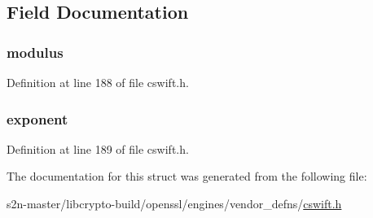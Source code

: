 \subsection{Field Documentation}
\subsubsection[{\texorpdfstring{modulus}{modulus}}]{ modulus}\hypertarget{struct___s_w___e_x_p_a9f75d3cee7e8a48a96f993a4d18b605e}{}\label{struct___s_w___e_x_p_a9f75d3cee7e8a48a96f993a4d18b605e}


Definition at line 188 of file cswift.\+h.

\subsubsection[{\texorpdfstring{exponent}{exponent}}]{ exponent}\hypertarget{struct___s_w___e_x_p_a791a36a530c111271191c771d69295dc}{}\label{struct___s_w___e_x_p_a791a36a530c111271191c771d69295dc}


Definition at line 189 of file cswift.\+h.



The documentation for this struct was generated from the following file\+:\begin{DoxyCompactItemize}
\item 
s2n-\/master/libcrypto-\/build/openssl/engines/vendor\+\_\+defns/\hyperlink{cswift_8h}{cswift.\+h}\end{DoxyCompactItemize}
